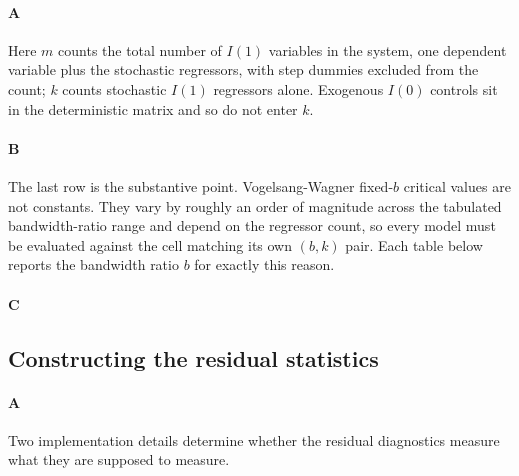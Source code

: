 \paragraph{A}
Here $m$ counts the total number of $I(1)$ variables in the system, one dependent variable plus the stochastic regressors, with step dummies excluded from the count; $k$ counts stochastic $I(1)$ regressors alone. Exogenous $I(0)$ controls sit in the deterministic matrix and so do not enter $k$.

\paragraph{B}
The last row is the substantive point. Vogelsang-Wagner fixed-$b$ critical values are not constants. They vary by roughly an order of magnitude across the tabulated bandwidth-ratio range and depend on the regressor count, so every model must be evaluated against the cell matching its own $(b, k)$ pair. Each table below reports the bandwidth ratio $b$ for exactly this reason.

\paragraph{C}

\subsection{Constructing the residual statistics}

\paragraph{A}
Two implementation details determine whether the residual diagnostics measure what they are supposed to measure.

